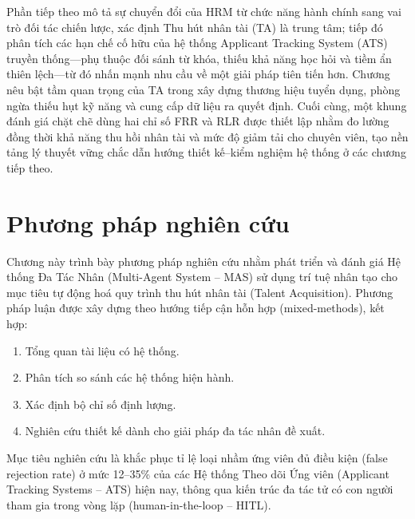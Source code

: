 \documentclass{article}
\newcommand{\nocontentsline}[3]{}
\newcommand{\tocless}[2]{\bgroup\let\addcontentsline=\nocontentsline#1{#2}\egroup}
\begin{document}
Phần tiếp theo mô tả sự chuyển đổi của HRM từ chức năng hành chính sang vai trò đối tác chiến lược, xác định Thu hút nhân tài (TA) là trung tâm; tiếp đó phân tích các hạn chế cố hữu của hệ thống Applicant Tracking System (ATS) truyền thống—phụ thuộc đối sánh từ khóa, thiếu khả năng học hỏi và tiềm ẩn thiên lệch—từ đó nhấn mạnh nhu cầu về một giải pháp tiên tiến hơn. Chương nêu bật tầm quan trọng của TA trong xây dựng thương hiệu tuyển dụng, phòng ngừa thiếu hụt kỹ năng và cung cấp dữ liệu ra quyết định. Cuối cùng, một khung đánh giá chặt chẽ dùng hai chỉ số FRR và RLR được thiết lập nhằm đo lường đồng thời khả năng thu hồi nhân tài và mức độ giảm tải cho chuyên viên, tạo nền tảng lý thuyết vững chắc dẫn hướng thiết kế–kiểm nghiệm hệ thống ở các chương tiếp theo.

\newpage

\tocless\section{Phương pháp nghiên cứu}
\addcontentsline{toc}{section}{\numberline{}CHƯƠNG 3: PHƯƠNG PHÁP NGHIÊN CỨU}
\setcounter{section}{3}

Chương này trình bày phương pháp nghiên cứu nhằm phát triển và đánh giá Hệ thống Đa Tác Nhân (Multi-Agent System – MAS) sử dụng trí tuệ nhân tạo cho mục tiêu tự động hoá quy trình thu hút nhân tài (Talent Acquisition). Phương pháp luận được xây dựng theo hướng tiếp cận hỗn hợp (mixed-methods), kết hợp:
\begin{enumerate}[topsep=0pt, itemsep=2pt, leftmargin=40pt, label=\arabic*.]
    \item Tổng quan tài liệu có hệ thống.
    \item Phân tích so sánh các hệ thống hiện hành.
    \item Xác định bộ chỉ số định lượng.
    \item Nghiên cứu thiết kế dành cho giải pháp đa tác nhân đề xuất.
\end{enumerate}

Mục tiêu nghiên cứu là khắc phục tỉ lệ loại nhầm ứng viên đủ điều kiện (false rejection rate) ở mức 12–35\% của các Hệ thống Theo dõi Ứng viên (Applicant Tracking Systems – ATS) hiện nay, thông qua kiến trúc đa tác tử có con người tham gia trong vòng lặp (human-in-the-loop – HITL).
\end{document}
